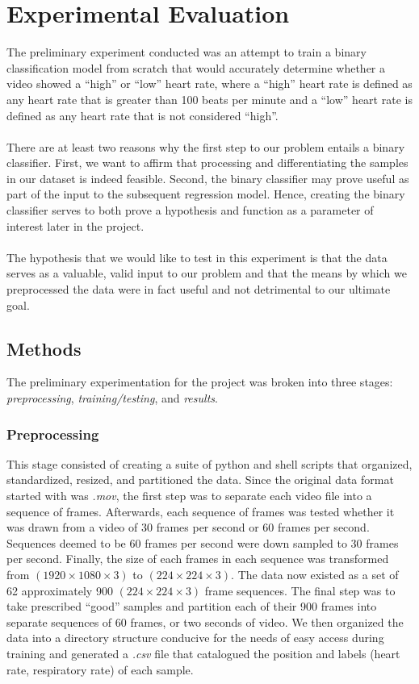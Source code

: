 \documentclass{article}
\begin{document}
\section*{Experimental Evaluation}{
The preliminary experiment conducted was an attempt to train a binary classification model from scratch that would accurately determine whether a video showed a  ``high'' or ``low'' heart rate, where a ``high'' heart rate is defined as any heart rate that is greater than 100 beats per minute and a ``low'' heart rate is defined as any heart rate that is not considered ``high''. \\ \\
\noindent There are at least two reasons why the first step to our problem entails a binary classifier. First, we want to affirm that processing and differentiating the samples in our dataset is indeed feasible. Second, the binary classifier may prove useful as part of the input to the subsequent regression model. Hence, creating the binary classifier serves to both prove a hypothesis and function as a parameter of interest later in the project. \\ \\
\noindent The hypothesis that we would like to test in this experiment is that the data serves as a valuable, valid input to our problem and that the means by which we preprocessed the data were in fact useful and not detrimental to our ultimate goal.
\subsection*{Methods}{The preliminary experimentation for the project was broken into three stages: \textit{preprocessing}, \textit{training/testing}, and \textit{results}.
\subsubsection*{Preprocessing}{This stage consisted of creating a suite of python and shell scripts that organized, standardized, resized, and partitioned the data. Since the original data format started with was \textit{.mov}, the first step was to separate each video file into a sequence of frames. Afterwards, each sequence of frames was tested whether it was drawn from a video of 30 frames per second or 60 frames per second. Sequences deemed to be 60 frames per second were down sampled to 30 frames per second. Finally, the size of each frames in each sequence was transformed from $(1920 \times 1080 \times 3)$ to $(224 \times 224 \times 3)$. The data now existed as a set of 62 approximately 900 $(224 \times 224 \times 3)$ frame sequences. The final step was to take prescribed ``good'' samples and partition each of their 900 frames into separate sequences of 60 frames, or two seconds of video. We then organized the data into a directory structure conducive for the needs of easy access during training and generated a \textit{.csv} file that catalogued the position and labels (heart rate, respiratory rate) of each sample.
}}
}
\end{document}
